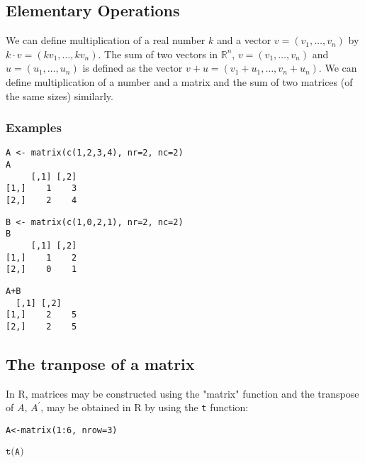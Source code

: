 \documentclass[12pt,a4paper]{article}
\theoremstyle{regla}
\theoremstyle{remark}
\theoremstyle{definition}
\theoremstyle{nonumberbreak}
\begin{document}
\subsection{Elementary Operations}
\begin{fbox}
\begin{minipage}{0.97\textwidth}
We can define multiplication of a real number $k$ and a vector $v=(v_1,\ldots,v_n)$ by $k\cdot v=(kv_1,\ldots,kv_n)$. The sum of two vectors in $\mathbb{R}^n$, $v=(v_1,\ldots,v_n)$ and $u=(u_1,\ldots,u_n)$ is defined as the vector $v+u=(v_1+u_1,\ldots,v_n+u_n)$. We can define multiplication of a number and a matrix and the sum of two matrices (of the same sizes) similarly.
\end{minipage}
\end{fbox}
\subsubsection{Examples}
\begin{xmpl}
\begin{lstlisting}
A <- matrix(c(1,2,3,4), nr=2, nc=2)
A
     [,1] [,2]
[1,]    1    3
[2,]    2    4
\end{lstlisting}

\begin{lstlisting}
B <- matrix(c(1,0,2,1), nr=2, nc=2)
B
     [,1] [,2]
[1,]    1    2
[2,]    0    1
\end{lstlisting}

\begin{lstlisting}
A+B
  [,1] [,2]
[1,]    2    5
[2,]    2    5
\end{lstlisting}
\end{xmpl}

\subsection{The tranpose of a matrix}
\begin{fbox}
\begin{minipage}{0.97\textwidth}
In R, matrices may be constructed using the "matrix" function and the transpose of $A$, $A^\prime$, may be obtained in R by using the \texttt{t} function:


\texttt{A<-matrix(1:6, nrow=3)}

$\texttt{t(A)}$


\end{minipage}
\end{fbox}
\end{document}
